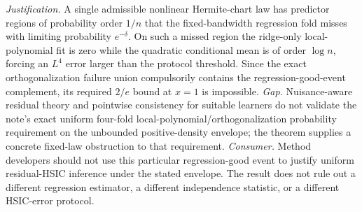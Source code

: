 \documentclass{article}
\begin{document}
\par\smallskip\noindent \textit{Justification.} A single admissible nonlinear Hermite-chart law has predictor regions of probability order \(1/n\) that the fixed-bandwidth regression fold misses with limiting probability \(e^{-\delta}\). On such a missed region the ridge-only local-polynomial fit is zero while the quadratic conditional mean is of order \(\log n\), forcing an \(L^4\) error larger than the protocol threshold. Since the exact orthogonalization failure union compulsorily contains the regression-good-event complement, its required \(2/e\) bound at \(x=1\) is impossible. \textit{Gap.} Nuisance-aware residual theory and pointwise consistency for suitable learners do not validate the note's exact uniform four-fold local-polynomial/orthogonalization probability requirement on the unbounded positive-density envelope; the theorem supplies a concrete fixed-law obstruction to that requirement. \textit{Consumer.} Method developers should not use this particular regression-good event to justify uniform residual-HSIC inference under the stated envelope. The result does not rule out a different regression estimator, a different independence statistic, or a different HSIC-error protocol.
\end{document}
